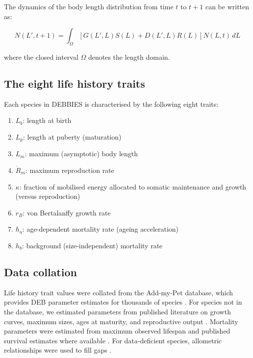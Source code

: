 \documentclass[11pt]{article}
\begin{document}
The dynamics of the body length distribution from time $t$ to $t+1$ can be written as:

\begin{equation}
N(L', t+1) = \int_{\Omega} \left[ G(L', L) S(L) + D(L', L) R(L) \right] N(L, t) \, dL
\end{equation}

\noindent where the closed interval $\Omega$ denotes the length domain.

\subsection{The eight life history traits}

Each species in DEBBIES is characterised by the following eight traits:

\begin{enumerate}
    \item $L_b$: length at birth
    \item $L_p$: length at puberty (maturation)
    \item $L_m$: maximum (asymptotic) body length
    \item $\dot{R}_m$: maximum reproduction rate
    \item $\kappa$: fraction of mobilised energy allocated to somatic maintenance and growth (versus reproduction)
    \item $\dot{r}_B$: von Bertalanffy growth rate
    \item $h_a$: age-dependent mortality rate (ageing acceleration)
    \item $h_b$: background (size-independent) mortality rate
\end{enumerate}

\subsection{Data collation}

Life history trait values were collated from the Add-my-Pet database, which provides DEB parameter estimates for thousands of species \citep{kooijman2019}. For species not in the database, we estimated parameters from published literature on growth curves, maximum sizes, ages at maturity, and reproductive output \citep{dureuil2022}. Mortality parameters were estimated from maximum observed lifespan and published survival estimates where available \citep{dulvy2016,smith1998,musick2004}. For data-deficient species, allometric relationships were used to fill gaps \citep{jabado2020,simpfendorfer2023}.
\end{document}
